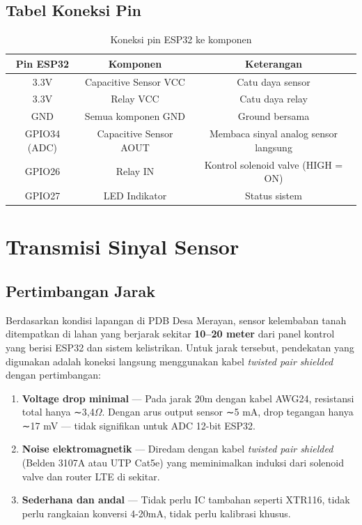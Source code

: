 \documentclass[12pt,a4paper,oneside]{report}
\begin{document}
\subsection{Tabel Koneksi Pin}

\begin{table}[H]
\centering
\caption{Koneksi pin ESP32 ke komponen}
\label{tab:pinout}
\begin{tabular}{c c c}
\toprule
\textbf{Pin ESP32} & \textbf{Komponen} & \textbf{Keterangan} \\
\midrule
3.3V & Capacitive Sensor VCC & Catu daya sensor \\
3.3V & Relay VCC & Catu daya relay \\
GND & Semua komponen GND & Ground bersama \\
GPIO34 (ADC) & Capacitive Sensor AOUT & Membaca sinyal analog sensor langsung \\
GPIO26 & Relay IN & Kontrol solenoid valve (HIGH = ON) \\
GPIO27 & LED Indikator & Status sistem \\
\bottomrule
\end{tabular}
\end{table}


\newpage
\section{Transmisi Sinyal Sensor}

\subsection{Pertimbangan Jarak}

Berdasarkan kondisi lapangan di PDB Desa Merayan, sensor kelembaban tanah ditempatkan di lahan yang berjarak sekitar \textbf{10--20 meter} dari panel kontrol yang berisi ESP32 dan sistem kelistrikan. Untuk jarak tersebut, pendekatan yang digunakan adalah koneksi langsung menggunakan kabel \textit{twisted pair shielded} dengan pertimbangan:

\begin{enumerate}
    \item \textbf{Voltage drop minimal} --- Pada jarak 20m dengan kabel AWG24, resistansi total hanya ∼3,4$\Omega$. Dengan arus output sensor ∼5 mA, drop tegangan hanya ∼17 mV --- tidak signifikan untuk ADC 12-bit ESP32.
    \item \textbf{Noise elektromagnetik} --- Diredam dengan kabel \textit{twisted pair shielded} (Belden 3107A atau UTP Cat5e) yang meminimalkan induksi dari solenoid valve dan router LTE di sekitar.
    \item \textbf{Sederhana dan andal} --- Tidak perlu IC tambahan seperti XTR116, tidak perlu rangkaian konversi 4-20mA, tidak perlu kalibrasi khusus.
\end{enumerate}
\end{document}

